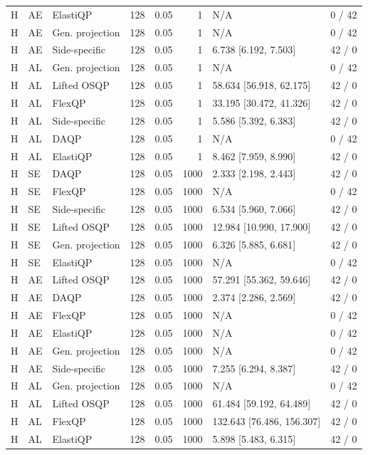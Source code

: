 \begin{longtable}{@{}lllrrrlr@{}}
H & AE & ElastiQP & 128 & 0.05 & 1 & N/A & 0 / 42 \\
H & AE & Gen. projection & 128 & 0.05 & 1 & N/A & 0 / 42 \\
H & AE & Side-specific & 128 & 0.05 & 1 & 6.738 [6.192, 7.503] & 42 / 0 \\
H & AL & Gen. projection & 128 & 0.05 & 1 & N/A & 0 / 42 \\
H & AL & Lifted OSQP & 128 & 0.05 & 1 & 58.634 [56.918, 62.175] & 42 / 0 \\
H & AL & FlexQP & 128 & 0.05 & 1 & 33.195 [30.472, 41.326] & 42 / 0 \\
H & AL & Side-specific & 128 & 0.05 & 1 & 5.586 [5.392, 6.383] & 42 / 0 \\
H & AL & DAQP & 128 & 0.05 & 1 & N/A & 0 / 42 \\
H & AL & ElastiQP & 128 & 0.05 & 1 & 8.462 [7.959, 8.990] & 42 / 0 \\
H & SE & DAQP & 128 & 0.05 & 1000 & 2.333 [2.198, 2.443] & 42 / 0 \\
H & SE & FlexQP & 128 & 0.05 & 1000 & N/A & 0 / 42 \\
H & SE & Side-specific & 128 & 0.05 & 1000 & 6.534 [5.960, 7.066] & 42 / 0 \\
H & SE & Lifted OSQP & 128 & 0.05 & 1000 & 12.984 [10.990, 17.900] & 42 / 0 \\
H & SE & Gen. projection & 128 & 0.05 & 1000 & 6.326 [5.885, 6.681] & 42 / 0 \\
H & SE & ElastiQP & 128 & 0.05 & 1000 & N/A & 0 / 42 \\
H & AE & Lifted OSQP & 128 & 0.05 & 1000 & 57.291 [55.362, 59.646] & 42 / 0 \\
H & AE & DAQP & 128 & 0.05 & 1000 & 2.374 [2.286, 2.569] & 42 / 0 \\
H & AE & FlexQP & 128 & 0.05 & 1000 & N/A & 0 / 42 \\
H & AE & ElastiQP & 128 & 0.05 & 1000 & N/A & 0 / 42 \\
H & AE & Gen. projection & 128 & 0.05 & 1000 & N/A & 0 / 42 \\
H & AE & Side-specific & 128 & 0.05 & 1000 & 7.255 [6.294, 8.387] & 42 / 0 \\
H & AL & Gen. projection & 128 & 0.05 & 1000 & N/A & 0 / 42 \\
H & AL & Lifted OSQP & 128 & 0.05 & 1000 & 61.484 [59.192, 64.489] & 42 / 0 \\
H & AL & FlexQP & 128 & 0.05 & 1000 & 132.643 [76.486, 156.307] & 42 / 0 \\
H & AL & ElastiQP & 128 & 0.05 & 1000 & 5.898 [5.483, 6.315] & 42 / 0 \\

\end{longtable}
